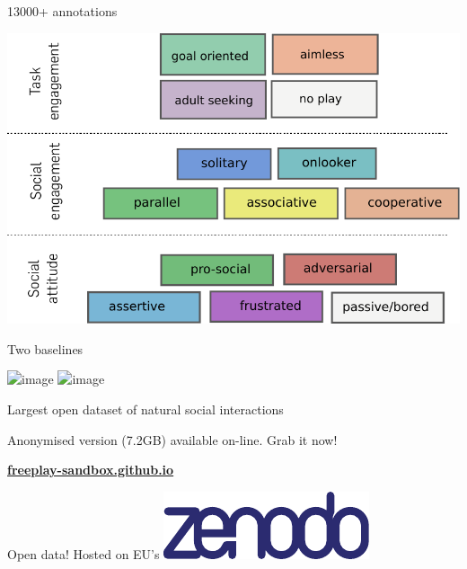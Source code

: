 \documentclass[xcolor=table]{beamer}
\begin{document}


\begin{frame}{13000+ annotations}
    \begin{center}
        \includegraphics[width=0.8\linewidth]{freeplay/coding-scheme}
    \end{center}
\end{frame}

\begin{frame}{Two baselines}

    \begin{center}
        \includegraphics<1>[width=\linewidth]{pinsoro/pinsoro-baselines}
        \includegraphics<2>[width=\linewidth]{pinsoro/pinsoro-baselines2}
    \end{center}
\end{frame}






\begin{frame}{Largest open dataset of natural social interactions}
    \Large
    \begin{center}
        \vspace{1cm}
        Anonymised version (7.2GB) available on-line. Grab it now!

        \LARGE \href{https://freeplay-sandbox.github.io}{\bf freeplay-sandbox.github.io}

        \vspace{1cm}
            \large Open data! Hosted on EU's  \includegraphics[width=0.3\linewidth]{zenodo}
    \end{center}
\end{frame}
\end{document}
